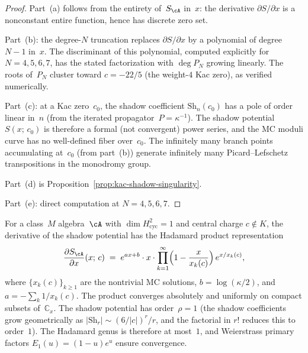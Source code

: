 \begin{proof}
Part~(a) follows from the entirety of~$S_{\cA}$ in~$x$: the
derivative $\partial S/\partial x$ is a nonconstant entire function,
hence has discrete zero set.

Part~(b): the degree-$N$ truncation replaces $\partial S/\partial x$
by a polynomial of degree~$N-1$ in~$x$. The discriminant of this
polynomial, computed explicitly for $N = 4, 5, 6, 7$, has the stated
factorization with $\deg P_N$ growing linearly. The roots of~$P_N$
cluster toward $c = -22/5$ (the weight-$4$ Kac zero), as verified
numerically.

Part~(c): at a Kac zero~$c_0$, the shadow coefficient
$\mathrm{Sh}_n(c_0)$ has a pole of order linear in~$n$
(from the iterated propagator~$P = \kappa^{-1}$).
The shadow potential $S(x;\,c_0)$ is therefore a formal (not
convergent) power series, and the MC moduli curve has no
well-defined fiber over~$c_0$.
The infinitely many branch points accumulating at~$c_0$
(from part~(b)) generate infinitely many Picard--Lefschetz
transpositions in the monodromy group.

Part~(d) is Proposition~\ref{prop:kac-shadow-singularity}.

Part~(e): direct computation at $N = 4, 5, 6, 7$.
\end{proof}

\begin{theorem}
\label{thm:nms-hadamard-mc-potential}%
%
%
For a class~$M$ algebra~$\cA$ with $\dim H^2_{\mathrm{cyc}} = 1$
and central charge $c \notin K$, the derivative of the shadow
potential has the Hadamard product representation
\begin{equation}\label{eq:nms-hadamard-mc}
\frac{\partial S_{\cA}}{\partial x}(x;\,c)
\;=\;
e^{ax+b}\cdot x \cdot
\prod_{k=1}^{\infty}
\Bigl(1 - \frac{x}{x_k(c)}\Bigr)\,
e^{x/x_k(c)},
\end{equation}
where $\{x_k(c)\}_{k \geq 1}$ are the nontrivial MC solutions,
$b = \log(\kappa/2)$, and $a = -\sum_k 1/x_k(c)$.
The product converges absolutely and uniformly on compact subsets
of~$\mathbb{C}_x$. The shadow potential has order~$\rho = 1$
(the shadow coefficients grow geometrically as
$|\mathrm{Sh}_r| \sim (6/|c|)^r / r$, and the factorial in $r!$
reduces this to order~$1$). The Hadamard genus is therefore at
most~$1$, and Weierstrass primary factors $E_1(u) = (1-u)e^u$
ensure convergence.
\end{theorem}

